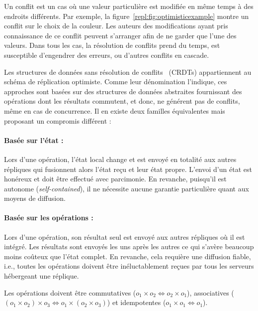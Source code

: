 Un conflit est un cas où une valeur particulière est modifiée en même temps à
des endroits différents. Par exemple, la figure~\ref{repl:fig:optimisticexample}
montre un conflit sur le choix de la couleur. Les auteurs des modifications
ayant pris connaissance de ce conflit peuvent s'arranger afin de ne garder que
l'une des valeurs. Dans tous les cas, la résolution de conflits prend du temps,
est susceptible d'engendrer des erreurs, ou d'autres conflits en cascade.

Les structures de données sans résolution de
conflits~\cite{shapiro2011comprehensive} (CRDTs) appartiennent au schéma de
réplication optimiste. Comme leur dénomination l'indique, ces approches sont
basées sur des structures de données abstraites fournissant des opérations dont
les résultats commutent, et donc, ne générent pas de conflits, même en cas de
concurrence.  Il en existe deux familles équivalentes mais proposant un
compromis différent :

\paragraph{Basée sur l'état :} Lors d'une opération, l'état local change et est
envoyé en totalité aux autres répliques qui fusionnent alors l'état reçu et leur
état propre. L'envoi d'un état est honéreux et doit être effectué avec
parcimonie. En revanche, puisqu'il est autonome (\emph{self-contained}), il ne
nécessite aucune garantie particulière quant aux moyens de diffusion.

\paragraph{Basée sur les opérations :} Lors d'une opération, son résultat seul
est envoyé aux autres répliques où il est intégré. Les résultats sont envoyés
les uns après les autres ce qui s'avère beaucoup moins coûteux que l'état
complet. En revanche, cela requière une diffusion fiable, i.e., toutes les
opérations doivent être inéluctablement reçues par tous les serveurs hébergeant
une réplique.

\noindent Les opérations doivent être commutatives
($o_1 \times o_2 \Leftrightarrow o_2 \times o_1$), associatives
($(o_1 \times o_2) \times o_3 \Leftrightarrow o_1 \times (o_2 \times o_3)$) et
idempotentes ($o_1 \times o_1 \Leftrightarrow o_1$).


